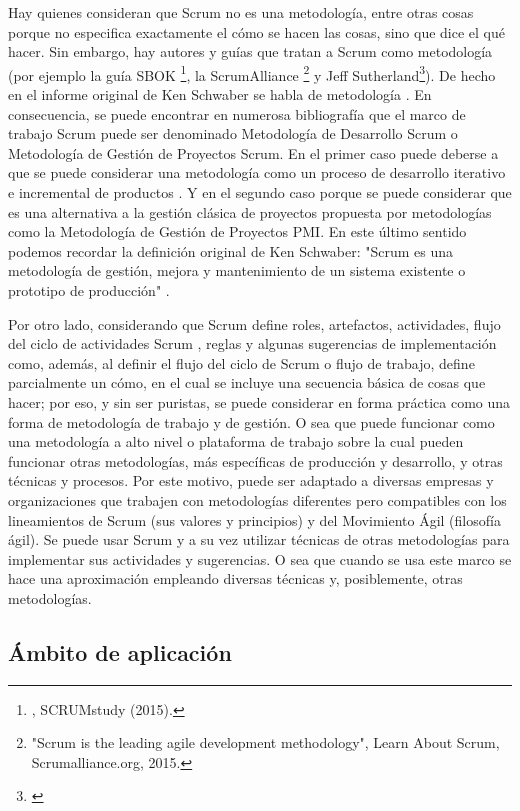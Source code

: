 Hay quienes consideran que Scrum no es una metodología, entre otras cosas porque no especifica exactamente el cómo se hacen las cosas, 
sino que dice el qué hacer. Sin embargo, hay autores y guías que tratan a Scrum como metodología (por ejemplo la guía SBOK \footnote{\cite{SBOK-2013}, SCRUMstudy (2015).}, la ScrumAlliance \footnote{"Scrum is the leading agile development methodology", Learn About Scrum, Scrumalliance.org, 2015.} y Jeff Sutherland\footnote{\cite{Jeff-Sutherland-2016}}). De hecho en el informe original de Ken Schwaber se habla de metodología \cite{Ken-Schwaber-1995}. En consecuencia, se puede encontrar en numerosa bibliografía que el marco de trabajo Scrum puede ser denominado Metodología de Desarrollo Scrum o Metodología de Gestión de Proyectos Scrum. 
En el primer caso puede deberse a que se puede considerar una metodología como un proceso de desarrollo iterativo e incremental de productos \cite{Ken-Schwaber-1995}. Y en el segundo caso porque se puede considerar que es una alternativa a la gestión clásica de proyectos propuesta por metodologías como la Metodología de Gestión de Proyectos PMI. En este último sentido podemos recordar la definición original de Ken Schwaber: "Scrum es una metodología de gestión, mejora y mantenimiento de un sistema existente o prototipo de producción" \cite{Ken-Schwaber-1995}.
 
Por otro lado, considerando que Scrum define roles, artefactos, actividades, flujo del ciclo de actividades Scrum \cite{Agile-Atlas-2012}, reglas y algunas sugerencias de implementación como, además, al definir el flujo del ciclo de Scrum o flujo de trabajo, define parcialmente un cómo, en el cual se incluye una secuencia básica de cosas que hacer; por eso, y sin ser puristas, se puede considerar en forma práctica como una forma de metodología de trabajo y de gestión. O sea que puede funcionar como una metodología a alto nivel o plataforma de trabajo sobre la cual pueden funcionar otras metodologías, más específicas de producción y desarrollo, y otras técnicas y procesos. Por este motivo, puede ser adaptado a diversas empresas y organizaciones que trabajen con metodologías diferentes pero compatibles con los lineamientos de Scrum (sus valores y principios) y del Movimiento Ágil (filosofía ágil). Se puede usar Scrum y a su vez utilizar técnicas de otras metodologías para implementar sus actividades y sugerencias. O sea que cuando se usa este marco se hace una aproximación empleando diversas técnicas y, posiblemente, otras metodologías.

\subsection{Ámbito de aplicación}

